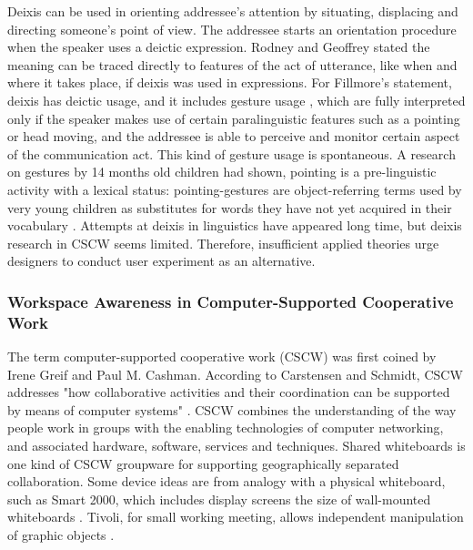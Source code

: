\documentclass[12pt,twoside]{article}
\begin{document}
Deixis can be used in orienting addressee’s attention by situating, displacing and directing someone’s point of view. The addressee starts an orientation procedure when the speaker uses a deictic expression. Rodney and Geoffrey stated the meaning can be traced directly to features of the act of utterance, like when and where it takes place, if deixis was used in expressions\cite{huddleston2006coordination}. For Fillmore’s statement, deixis has deictic usage, and it includes gesture usage  \cite{fillmore1997lectures}, which are fully interpreted only if the speaker makes use of certain paralinguistic features such as a pointing or head moving, and the addressee is able to perceive and monitor certain aspect of the communication act. This kind of gesture usage is spontaneous. A research on gestures by 14 months old children had shown, pointing is a pre-linguistic activity with a lexical status: pointing-gestures are object-referring terms used by very young children as substitutes for words they have not yet acquired in their vocabulary \cite{goldin2007young}. Attempts at deixis in linguistics have appeared long time, but deixis research in CSCW seems limited. Therefore, insufficient applied theories urge designers to conduct user experiment as an alternative.\\

\subsubsection{Workspace Awareness in Computer-Supported Cooperative Work}

The term computer-supported cooperative work (CSCW) was first coined by Irene Greif and Paul M. Cashman. According to Carstensen and Schmidt, CSCW addresses "how collaborative activities and their coordination can be supported by means of computer systems" \cite{carstensen1999computer}.  CSCW combines the understanding of the way people work in groups with the enabling technologies of computer networking, and associated hardware, software, services and techniques. Shared whiteboards is one kind of CSCW groupware for supporting geographically separated collaboration. Some device ideas are from analogy with a physical whiteboard, such as Smart 2000, which includes display screens the size of wall-mounted whiteboards \cite{martin1995smart}. Tivoli, for small working meeting, allows independent manipulation of graphic objects \cite{moran1995some}. 
\end{document}
